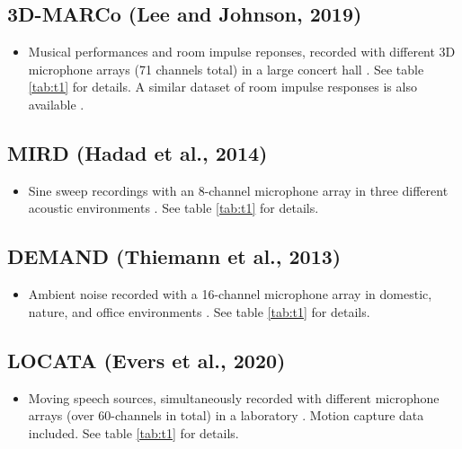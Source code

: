 \documentclass[14pt, legalpaper]{extarticle}
\begin{document}
\subsection{3D-MARCo (Lee and Johnson, 2019)}

\begin{itemize}

\item Musical performances and room impulse reponses, recorded with different 3D microphone arrays (71 channels total) in a large concert hall \cite{lee3d}. See table \ref{tab:t1} for details. A similar dataset of room impulse responses is also available \cite{lee2017microphone}.

\end{itemize}

\subsection{MIRD (Hadad et al., 2014)}

\begin{itemize}

\item Sine sweep recordings with an 8-channel microphone array in three different acoustic environments \cite{hadad2014multichannel}. See table \ref{tab:t1} for details.

\end{itemize}

\subsection{DEMAND (Thiemann et al., 2013)}

\begin{itemize}

\item Ambient noise recorded with a 16-channel microphone array in domestic, nature, and office environments \cite{thiemann2013demand}. See table \ref{tab:t1} for details.

\end{itemize}

\subsection{LOCATA (Evers et al., 2020)}

\begin{itemize}

\item Moving speech sources, simultaneously recorded with different microphone arrays (over 60-channels in total) in a laboratory \cite{evers2020data}. Motion capture data included. See table \ref{tab:t1} for details.

\end{itemize}
\end{document}
